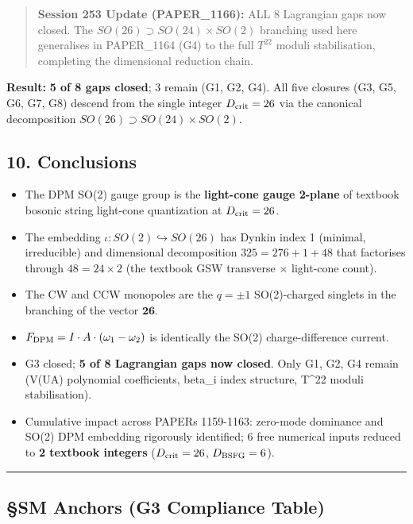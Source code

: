 \documentclass[
]{article}
\providecommand{\tightlist}{%
  \setlength{\itemsep}{0pt}\setlength{\parskip}{0pt}}
\begin{document}
\begin{quote}
\textbf{Session 253 Update (PAPER\_1166):} ALL 8 Lagrangian gaps now
closed. The \(SO(26)\supset SO(24)\times SO(2)\) branching used here
generalises in PAPER\_1164 (G4) to the full \(T^{22}\) moduli
stabilisation, completing the dimensional reduction chain.
\end{quote}

\textbf{Result:} \textbf{5 of 8 gaps closed}; 3 remain (G1, G2, G4). All
five closures (G3, G5, G6, G7, G8) descend from the single integer
\(D_{\rm crit}=26\) via the canonical decomposition
\(SO(26)\supset SO(24)\times SO(2)\).

\subsection{10. Conclusions}\label{conclusions}

\begin{itemize}
\tightlist
\item
  The DPM SO(2) gauge group is the \textbf{light-cone gauge 2-plane} of
  textbook bosonic string light-cone quantization at
  \(D_{\rm crit}=26\).
\item
  The embedding \(\iota: SO(2)\hookrightarrow SO(26)\) has Dynkin index
  1 (minimal, irreducible) and dimensional decomposition
  \(325 = 276 + 1 + 48\) that factorises through \(48 = 24 \times 2\)
  (the textbook GSW transverse \(\times\) light-cone count).
\item
  The CW and CCW monopoles are the \(q=\pm 1\) SO(2)-charged singlets in
  the branching of the vector \(\mathbf{26}\).
\item
  \(F_{\rm DPM} = I\cdot A\cdot(\omega_1-\omega_2)\) is identically the
  SO(2) charge-difference current.
\item
  G3 closed; \textbf{5 of 8 Lagrangian gaps now closed}. Only G1, G2, G4
  remain (V(UA) polynomial coefficients, beta\_i index structure,
  T\^{}22 moduli stabilisation).
\item
  Cumulative impact across PAPERs 1159-1163: zero-mode dominance and
  SO(2) DPM embedding rigorously identified; 6 free numerical inputs
  reduced to \textbf{2 textbook integers} (\(D_{\rm crit}=26\),
  \(D_{\rm BSFG}=6\)).
\end{itemize}

\begin{center}\rule{0.5\linewidth}{0.5pt}\end{center}

\subsection{§SM Anchors (G3 Compliance
Table)}\label{sm-anchors-g3-compliance-table}
\end{document}
